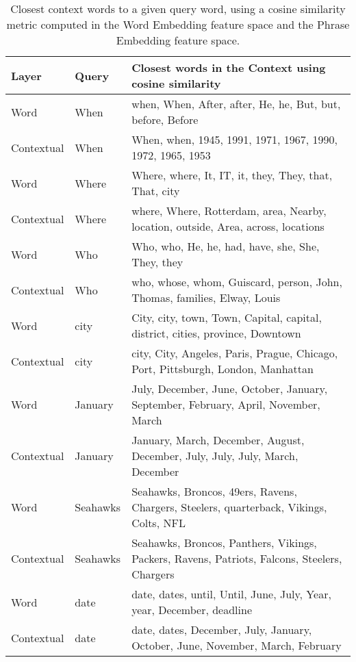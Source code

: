 \documentclass{article} \usepackage{iclr2017_conference,times}
\begin{document}
\begin{table}[]
    \scriptsize
    \centering
\begin{tabular}{ lll }
        \hline
        \textbf{Layer} & \textbf{Query} & \textbf{Closest words in the Context using cosine similarity} \\
        \hline
        \hline
        Word & When & when, When, After, after, He, he, But, but, before, Before \\
        Contextual & When & When, when, 1945, 1991, 1971, 1967, 1990, 1972, 1965, 1953 \\
        \hline
        Word & Where & Where, where, It, IT, it, they, They, that, That, city \\
        Contextual & Where & where, Where, Rotterdam, area, Nearby, location, outside, Area, across, locations \\
        \hline
        Word & Who & Who, who, He, he, had, have, she, She, They, they \\
        Contextual & Who & who, whose, whom, Guiscard, person, John, Thomas, families, Elway, Louis \\
        \hline
        Word & city & City, city, town, Town, Capital, capital, district, cities, province, Downtown \\
        Contextual & city & city, City, Angeles, Paris, Prague, Chicago, Port, Pittsburgh, London, Manhattan \\
        \hline
        Word & January & July, December, June, October, January, September, February, April, November, March \\
        Contextual & January & January, March, December, August, December, July, July, July, March, December \\
        \hline
        Word & Seahawks & Seahawks, Broncos, 49ers, Ravens, Chargers, Steelers, quarterback, Vikings, Colts, NFL \\
        Contextual & Seahawks & Seahawks, Broncos, Panthers, Vikings, Packers, Ravens, Patriots, Falcons, Steelers, Chargers \\
        \hline
        Word & date & date, dates, until, Until, June, July, Year, year, December, deadline \\
        Contextual & date & date, dates, December, July, January, October, June, November, March, February \\
        \hline
    \end{tabular}
\caption{\small Closest context words to a given query word, using a cosine similarity metric computed in the Word Embedding feature space and the Phrase Embedding feature space.}
    \label{tab:viz_closest}
\end{table}
\end{document}
